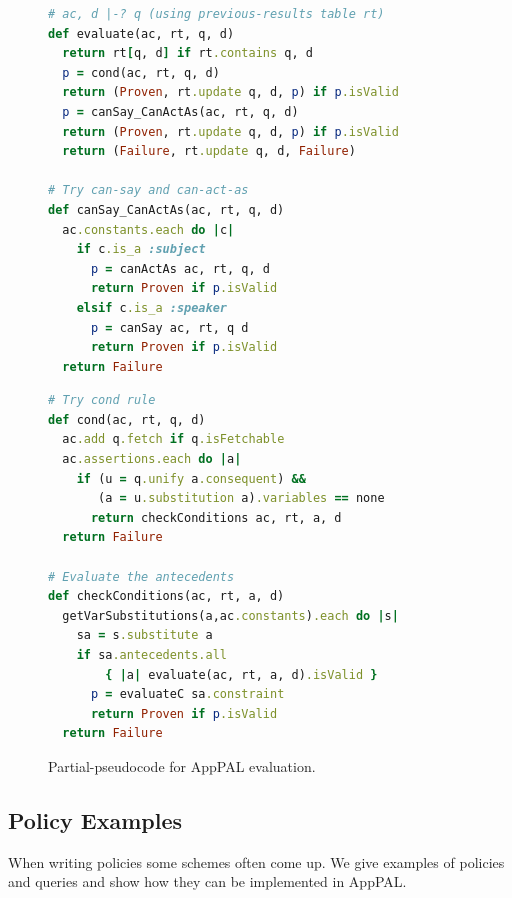 \documentclass[]{scrartcl}
\begin{document}
\begin{figure}
\begin{minipage}[b]{0.5\linewidth}
\begin{lstlisting}[language=Ruby, basicstyle=\ttfamily\scriptsize, keywordstyle=\scriptsize\slshape, columns=flexible]
# ac, d |-? q (using previous-results table rt)
def evaluate(ac, rt, q, d)
  return rt[q, d] if rt.contains q, d
  p = cond(ac, rt, q, d)
  return (Proven, rt.update q, d, p) if p.isValid
  p = canSay_CanActAs(ac, rt, q, d)
  return (Proven, rt.update q, d, p) if p.isValid
  return (Failure, rt.update q, d, Failure)

# Try can-say and can-act-as
def canSay_CanActAs(ac, rt, q, d)
  ac.constants.each do |c|
    if c.is_a :subject
      p = canActAs ac, rt, q, d
      return Proven if p.isValid
    elsif c.is_a :speaker
      p = canSay ac, rt, q d
      return Proven if p.isValid
  return Failure
\end{lstlisting}
\end{minipage}
\begin{minipage}[b]{0.5\linewidth}
\begin{lstlisting}[language=Ruby, basicstyle=\ttfamily\scriptsize, keywordstyle=\scriptsize\slshape, columns=flexible]
# Try cond rule
def cond(ac, rt, q, d)
  ac.add q.fetch if q.isFetchable
  ac.assertions.each do |a|
    if (u = q.unify a.consequent) &&
       (a = u.substitution a).variables == none
      return checkConditions ac, rt, a, d
  return Failure

# Evaluate the antecedents
def checkConditions(ac, rt, a, d)
  getVarSubstitutions(a,ac.constants).each do |s|
    sa = s.substitute a
    if sa.antecedents.all
        { |a| evaluate(ac, rt, a, d).isValid }
      p = evaluateC sa.constraint
      return Proven if p.isValid
  return Failure
\end{lstlisting}
\end{minipage}
\caption{Partial-pseudocode for AppPAL evaluation.}
\label{fig:pseudocode}
\end{figure}

\subsection{Policy Examples}
\label{ssec:idioms}

When writing policies some schemes often come up.
We give examples of policies and queries and show how they can be implemented in AppPAL.
\end{document}
